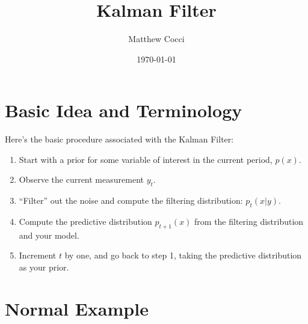\documentclass[a4paper,12pt]{scrartcl}
\author{Matthew Cocci}
\title{Kalman Filter}
\date{\today}
\begin{document}
\maketitle


\section{Basic Idea and Terminology}

Here's the basic procedure associated with the Kalman
Filter:
\begin{enumerate}
    \item Start with a prior for some variable of interest
	in the current period, $p(x)$.
    \item Observe the current measurement $y_t$.
    \item ``Filter'' out the noise and 
	compute the filtering distribution: $p_t(x | y)$.
    \item Compute the predictive distribution $p_{t+1}(x)$
	from the filtering distribution and your model.
    \item Increment $t$ by one, and go back to step 1, taking
	the predictive distribution as your prior.

\end{enumerate}

\section{Normal Example}
\end{document}
